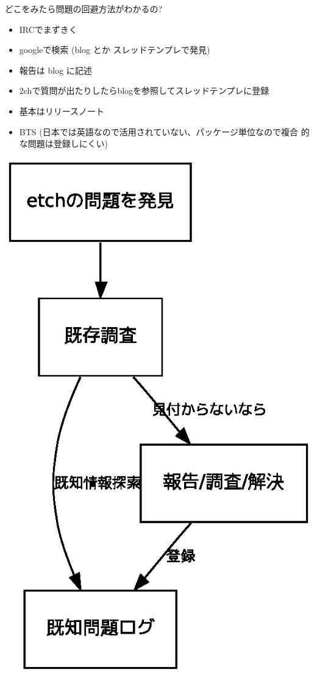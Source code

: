\documentclass[cjk,dvipdfmx,12pt]{beamer}
\begin{document}
\begin{frame}{どこをみたら問題の回避方法がわかるの?}
\begin{minipage}{0.5\hsize}
 \begin{itemize}
  \item IRCでまずきく
  \item googleで検索 (blog とか スレッドテンプレで発見)
  \item 報告は blog に記述
  \item 2chで質問が出たりしたらblogを参照してスレッドテンプレに登録
 \end{itemize}
 \begin{itemize}
  \item 基本はリリースノート
  \item BTS (日本では英語なので活用されていない、パッケージ単位なので複合
	的な問題は登録しにくい)
 \end{itemize}
\end{minipage}
\begin{minipage}{0.4\hsize}
 \includegraphics[height=0.8\vsize]{image200705/problemcycle.eps}
\end{minipage}
\end{frame}
\end{document}
